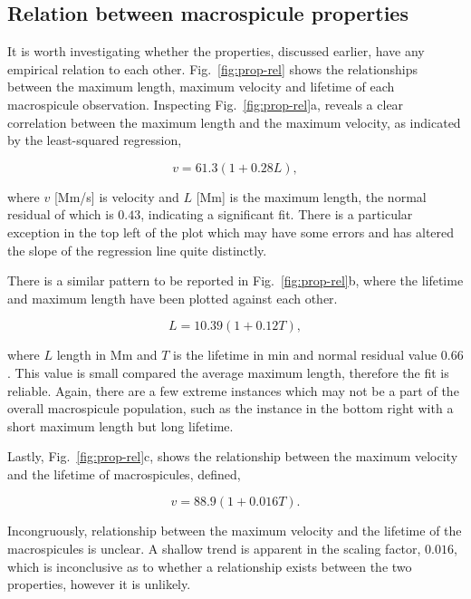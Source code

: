\subsection{Relation between macrospicule properties}
It is worth investigating whether the properties, discussed earlier, have any empirical relation to each other. Fig.~\ref{fig:prop-rel} shows the relationships between the maximum length, maximum velocity and lifetime of each macrospicule observation. Inspecting Fig.~\ref{fig:prop-rel}a, reveals a clear correlation between the maximum length and the maximum velocity, as indicated by the least-squared regression, 

\begin{equation}
v = 61.3(1 + 0.28L),
\end{equation}

\noindent where $v$ [Mm/s] is velocity and $L$ [Mm] is the maximum length, the normal residual of which is $0.43$, indicating a significant fit. There is a particular exception in the top left of the plot which may have some errors and has altered the slope of the regression line quite distinctly.

There is a similar pattern to be reported in Fig.~\ref{fig:prop-rel}b, where the lifetime and maximum length have been plotted against each other.

\begin{equation}
L = 10.39(1 + 0.12T),
\end{equation}

\noindent where $L$ length in Mm and $T$ is the lifetime in min and normal residual value $0.66$. This value is small compared the average maximum length, therefore the fit is reliable. Again, there are a few extreme instances which may not be a part of the overall macrospicule population, such as the instance in the bottom right with a short maximum length but long lifetime. 

Lastly, Fig.~\ref{fig:prop-rel}c, shows the relationship between the maximum velocity and the lifetime of macrospicules, defined,

\begin{equation}
v = 88.9(1 + 0.016T).
\end{equation}

Incongruously, relationship between the maximum velocity and the lifetime of the macrospicules is unclear. A shallow trend is apparent in the scaling factor, $0.016$, which is inconclusive as to whether a relationship exists between the two properties, however it is unlikely.

